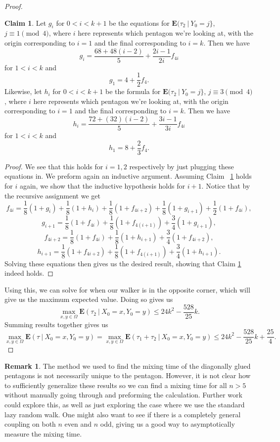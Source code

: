 \documentclass[10pt,a4paper]{amsart}
\theoremstyle{definition}
\numberwithin{definition}{section}
\newtheorem{remark}[definition]{Remark}
\newtheorem{claim}[definition]{Claim}
\begin{document}
\begin{proof}
\begin{claim}\label{claim:snarl}
Let $g_i$ for $0 < i < k+1$ be the equations for $\mathbf{E}(\tau_2 \ | \ Y_0 = j\}$, $j \equiv 1 \pmod{4}$, where $i$ here represents which pentagon we're looking at, with the origin corresponding to $i=1$ and the final corresponding to $i=k$. Then we have 
\[ g_i = \frac{68 + 48(i-2)}{5} + \frac{2i-1}{2i}f_{4i}\]
for $1 < i < k$ and 
\[ g_1 = 4 + \frac{1}{2}f_4.\]
Likewise, let $h_i$ for $0 < i < k+1$ be the formula for $\mathbf{E}(\tau_2 \ | \ Y_0 = j\}$, $j \equiv 3 \pmod{4}$, where $i$ here represents which pentagon we're looking at, with the origin corresponding to $i=1$ and the final corresponding to $i=k$. Then we have 
\[h_i = \frac{72 + (32)(i-2)}{5} + \frac{3i-1}{3i}f_{4i} \]
for $1 < i < k$ and 
\[h_1 = 8 + \frac{2}{3}f_4. \]
\end{claim}

\begin{proof}
We see that this holds for $i=1,2$ respectively by just plugging these equations in. We preform again an inductive argument. Assuming Claim ~\ref{claim:snarl} holds for $i$ again, we show that the inductive hypothesis holds for $i+1$. Notice that by the recursive assignment we get
\[ f_{4i} = \frac{1}{8}(1+g_i) + \frac{1}{8}(1+h_i) + \frac{1}{8}(1+f_{4i+2}) + \frac{1}{8}(1+g_{i+1}) + \frac{1}{2}(1+f_{4i}), \]
\[ g_{i+1} = \frac{1}{8}(1+f_{4i}) + \frac{1}{8}(1+f_{4(i+1)}) + \frac{3}{4}(1+g_{i+1}),\]
\[f_{4i+2} = \frac{1}{8}(1+f_{4i}) + \frac{1}{8}(1+h_{i+1}) + \frac{3}{4}(1+f_{4i+2}), \]
\[h_{i+1} = \frac{1}{8}(1+f_{4i+2}) + \frac{1}{8}(1+f_{4(i+1)}) + \frac{3}{4}(1+h_{i+1}). \]
Solving these equations then gives us the desired result, showing that Claim \ref{claim:snarl} indeed holds.
\end{proof}

Using this, we can solve for when our walker is in the opposite corner, which will give us the maximum expected value. Doing so gives us 
\[ \max_{x, y \in \Omega} \mathbf{E}(\tau_2 \ | \ X_0 =x, Y_0 = y) \leq 24k^2 - \frac{528}{25}k. \]
Summing results together gives us
\[ \max_{x, y \in \Omega} \mathbf{E}(\tau \ | \ X_0 = x, Y_0 = y) = \max_{x, y \in \Omega} \mathbf{E}(\tau_1 + \tau_2 \ | \ X_0 = x, Y_0 = y) \leq 24k^2 - \frac{528}{25}k + \frac{25}{4}.\]

\end{proof}

\begin{remark}
The method we used to find the mixing time of the diagonally glued pentagons is not necessarily unique to the pentagon. However, it is not clear how to sufficiently generalize these results so we can find a mixing time for all $n > 5$ without manually going through and preforming the calculation. Further work could explore this, as well as just exploring the case where we use the standard lazy random walk. One might also want to see if there is a completely general coupling on both $n$ even and $n$ odd, giving us a good way to asymptotically measure the mixing time. 
\end{remark}
\end{document}

